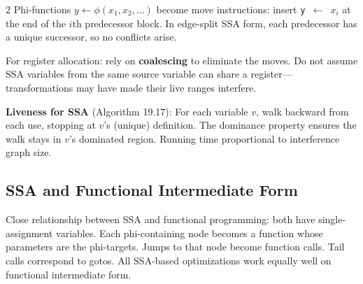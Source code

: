 \documentclass[9pt,landscape]{extarticle}
\begin{document}
\begin{multicols}{2}
Phi-functions $y \leftarrow \phi(x_1, x_2, \ldots)$ become move instructions: insert \texttt{y $\leftarrow$ $x_i$} at the end of the $i$th predecessor block. In edge-split SSA form, each predecessor has a unique successor, so no conflicts arise.

For register allocation: rely on \textbf{coalescing} to eliminate the moves. Do not assume SSA variables from the same source variable can share a register---transformations may have made their live ranges interfere.

\textbf{Liveness for SSA} (Algorithm 19.17): For each variable $v$, walk backward from each use, stopping at $v$'s (unique) definition. The dominance property ensures the walk stays in $v$'s dominated region. Running time proportional to interference graph size.

\subsection{SSA and Functional Intermediate Form}

Close relationship between SSA and functional programming: both have single-assignment variables. Each phi-containing node becomes a function whose parameters are the phi-targets. Jumps to that node become function calls. Tail calls correspond to gotos. All SSA-based optimizations work equally well on functional intermediate form.

\end{multicols}
\end{document}
